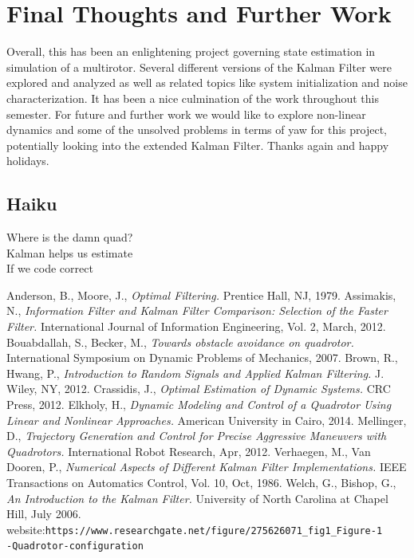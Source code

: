 \documentclass[12pt]{extarticle}
\begin{document}
\section{Final Thoughts and Further Work}{
Overall, this has been an enlightening project governing state estimation in simulation of a multirotor. Several different versions of the Kalman Filter were explored and analyzed as well as related topics like system initialization and noise characterization. It has been a nice culmination of the work throughout this semester. For future and further work we would like to explore non-linear dynamics and some of the unsolved problems in terms of yaw for this project, potentially looking into the extended Kalman Filter. Thanks again and happy holidays.

\subsection{Haiku}

{
Where is the damn quad?\\
Kalman helps us estimate\\
If we code correct
}
}

\clearpage
\begin{thebibliography}{9}
     Anderson, B., Moore, J., \textit{Optimal Filtering.} Prentice Hall, NJ, 1979.
     Assimakis, N., \textit{Information Filter and Kalman Filter Comparison:  Selection of the Faster Filter.} International Journal of Information Engineering, Vol. 2, March, 2012.
     Bouabdallah, S., Becker, M., \textit{Towards obstacle avoidance on
    quadrotor.} International Symposium on Dynamic Problems of Mechanics, 2007.
     Brown, R., Hwang, P., \textit{Introduction to Random Signals and Applied Kalman Filtering.} J. Wiley, NY, 2012.
     Crassidis, J., \textit{Optimal Estimation of Dynamic Systems.} CRC Press, 2012.
     Elkholy, H., \textit{Dynamic Modeling and Control of a Quadrotor Using Linear and Nonlinear Approaches.} American University in Cairo, 2014.
     Mellinger, D., \textit{Trajectory Generation and Control for Precise Aggressive Maneuvers with Quadrotors.} International Robot Research, Apr, 2012.
    Verhaegen, M., Van Dooren, P., \textit{Numerical Aspects of Different Kalman Filter Implementations.} IEEE Transactions on Automatics Control, Vol. 10, Oct, 1986.
     Welch, G., Bishop, G., \textit{An Introduction to the Kalman Filter.} University of North Carolina at Chapel Hill, July 2006.
    website:\texttt{https://www.researchgate.net/figure/275626071\_fig1\_Figure-1\\
    -Quadrotor-configuration}
\end{thebibliography}
\end{document}
